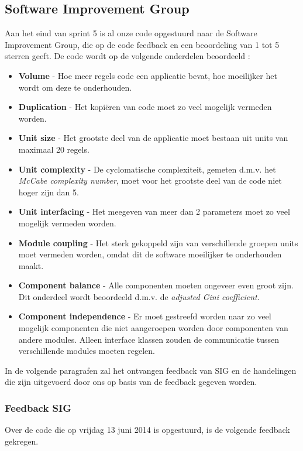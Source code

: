 \subsection{Software Improvement Group}
Aan het eind van sprint 5 is al onze code opgestuurd naar de Software Improvement Group, die op de code feedback en een beoordeling van 1 tot 5 sterren geeft. De code wordt op de volgende onderdelen beoordeeld \cite{sigmanual}:
\begin{itemize}
\item \textbf{Volume} - Hoe meer regels code een applicatie bevat, hoe moeilijker het wordt om deze te onderhouden.
\item \textbf{Duplication} - Het kopi\"eren van code moet zo veel mogelijk vermeden worden.
\item \textbf{Unit size} - Het grootste deel van de applicatie moet bestaan uit units van maximaal 20 regels.
\item \textbf{Unit complexity} - De cyclomatische complexiteit, gemeten d.m.v. het \emph{McCabe complexity number}, moet voor het grootste deel van de code niet hoger zijn dan 5.
\item \textbf{Unit interfacing} - Het meegeven van meer dan 2 parameters moet zo veel mogelijk vermeden worden.
\item \textbf{Module coupling} - Het sterk gekoppeld zijn van verschillende groepen units moet vermeden worden, omdat dit de software moeilijker te onderhouden maakt.
\item \textbf{Component balance} - Alle componenten moeten ongeveer even groot zijn. Dit onderdeel wordt beoordeeld d.m.v. de \emph{adjusted Gini coefficient}.
\item \textbf{Component independence} - Er moet gestreefd worden naar zo veel mogelijk componenten die niet aangeroepen worden door componenten van andere modules. Alleen interface klassen zouden de communicatie tussen verschillende modules moeten regelen.
\end{itemize}

In de volgende paragrafen zal het ontvangen feedback van SIG en de handelingen die zijn uitgevoerd door ons op basis van de feedback gegeven worden.

\subsubsection{Feedback SIG}
Over de code die op vrijdag 13 juni 2014 is opgestuurd, is de volgende feedback gekregen.

